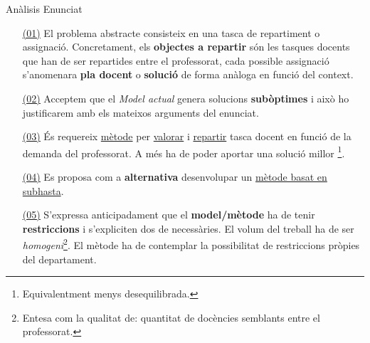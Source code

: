 \documentclass[twocolumn]{beamer}
\begin{document}
\begin{frame}
\begin{block}{Anàlisis Enunciat}
\begin{itemize}
	\footnotesize
	\item[{ \color{cyan!60} \underline{\underline{\normalcolor (01)}}}] El problema abstracte consisteix en una tasca de repartiment o assignació. Concretament, els \textbf{objectes a repartir} són les tasques docents que han de ser repartides entre  el professorat, cada possible assignació s'anomenara \textbf{pla docent} o \textbf{solució} de forma anàloga en funció del context.\\
	\item[{ \color{blue!60} \underline{\underline{\normalcolor (02)}}}] Acceptem que el \textit{Model actual} genera solucions \textbf{subòptimes} i això ho  justificarem amb els mateixos arguments del enunciat.\\
	\item[{ \color{green!60} \underline{\underline{\normalcolor (03)}}}] És requereix { \color{green!60} \underline{\normalcolor mètode}} per { \color{green!60} \underline{\normalcolor valorar}} i { \color{green!60} \underline{\normalcolor repartir}} tasca docent en funció de la demanda del professorat. A més ha de poder aportar una solució millor \footnote{Equivalentment menys desequilibrada.}. 
	\item[{ \color{purple!60} \underline{\underline{\normalcolor (04)}}}] Es proposa com a \textbf{alternativa}  desenvolupar un  { \color{purple!60} \underline{\normalcolor mètode basat en subhasta}}.
	\item[{ \color{violet!60} \underline{\underline{\normalcolor (05)}}}] S'expressa anticipadament que el \textbf{model/mètode} ha de tenir \textbf{restriccions}  i s'expliciten dos de necessàries. El volum del treball ha de ser \textit{homogeni}\footnote{Entesa com la qualitat de: quantitat de docències semblants entre el professorat.}. El mètode ha de contemplar la possibilitat de restriccions pròpies del departament. 
\end{itemize}
\end{block}
\end{frame}
\end{document}
